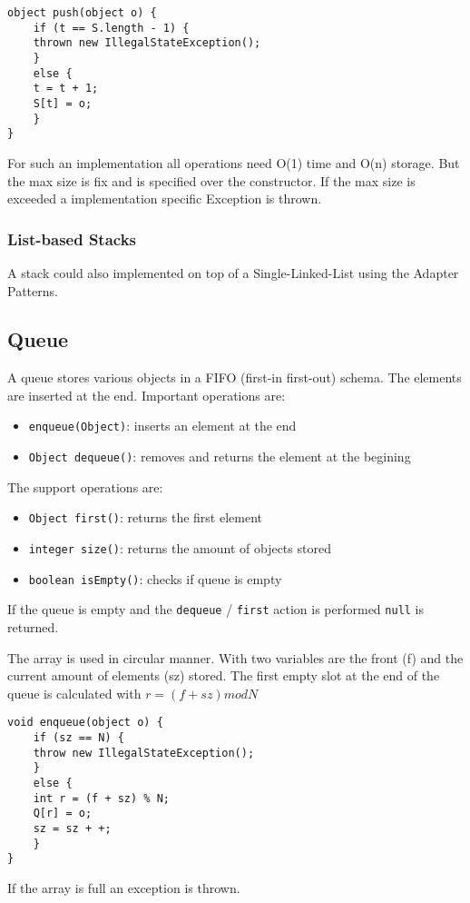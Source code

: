 \documentclass[11pt,twoside,landscape]{article}
\begin{document}
\begin{multicols}{2}
\begin{verbatim}
object push(object o) {
    if (t == S.length - 1) {
	thrown new IllegalStateException();
    }
    else {
	t = t + 1;
	S[t] = o;
    }
}
\end{verbatim}

For such an implementation all operations need O(1) time and O(n) storage. But the max size is fix and is specified over the constructor. If the max size is exceeded a implementation specific Exception is thrown.

\subsubsection*{List-based Stacks}
\label{sec:org44af3b4}
A stack could also implemented on top of a Single-Linked-List using the Adapter Patterns.

\subsection*{Queue}
\label{sec:org715d9a6}
A queue stores various objects in a FIFO (first-in first-out) schema. The elements are inserted at the end. Important operations are:
\begin{itemize}
\item \texttt{enqueue(Object)}: inserts an element at the end
\item \texttt{Object dequeue()}: removes and returns the element at the begining
\end{itemize}

The support operations are:
\begin{itemize}
\item \texttt{Object first()}: returns the first element
\item \texttt{integer size()}: returns the amount of objects stored
\item \texttt{boolean isEmpty()}: checks if queue is empty
\end{itemize}

If the queue is empty and the \texttt{dequeue} / \texttt{first} action is performed \texttt{null} is returned.

The array is used in circular manner. With two variables are the front (f) and the current amount of elements (sz) stored. The first empty slot at the end of the queue is calculated with \(r = (f + sz) mod N\)

\begin{verbatim}
void enqueue(object o) {
    if (sz == N) {
	throw new IllegalStateException();
    }
    else {
	int r = (f + sz) % N;
	Q[r] = o;
	sz = sz + +;
    }
}
\end{verbatim}
If the array is full an exception is thrown.


\end{multicols}
\end{document}
